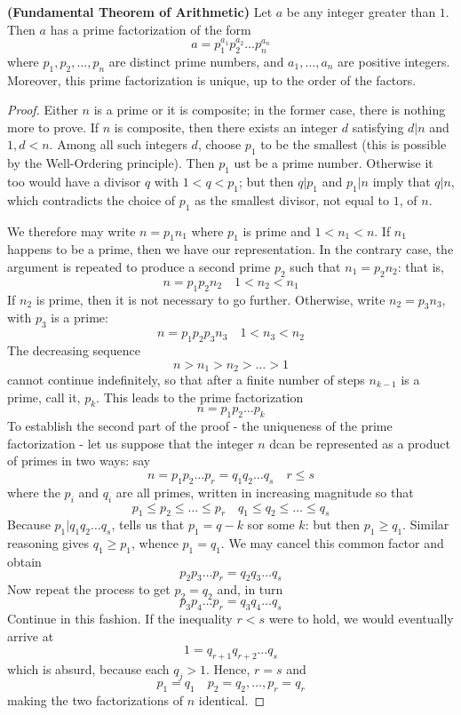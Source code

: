\begin{theorem}
    \textbf{(Fundamental Theorem of Arithmetic)} Let $a$ be any integer greater than $1$. Then $a$ has a prime factorization of the form
    \[
    a=p_1^{a_1}p_2^{a_2}\ldots p_n^{a_n}
    \]
    where $p_1,p_2,\ldots,p_n$ are distinct prime numbers, and $a_1,\ldots,a_n$ are positive integers. Moreover, this prime factorization is unique, up to the order of the factors.
\end{theorem}
\begin{proof}
    Either $n$ is a prime or it is composite; in the former case, there is nothing more to prove. If $n$ is composite, then there exists an integer $d$ satisfying $d|n$ and $1,d<n$. Among all such integers $d$, choose $p_1$ to be the smallest (this is possible by the Well-Ordering principle). Then $p_1$ ust be a prime number. Otherwise it too would have a divisor $q$ with $1<q<p_1$; but then $q|p_1$ and $p_1|n$ imply that $q|n$, which contradicts the choice of $p_1$ as the smallest divisor, not equal to $1$, of $n$.

    We therefore may write $n=p_1n_1$ where $p_1$ is prime and $1<n_1<n$. If $n_1$ happens to be a prime, then we have our representation. In the contrary case, the argument is repeated to produce a second prime $p_2$ such that $n_1 = p_2n_2$: that is,
    \[
    n=p_1p_2n_2\quad 1<n_2<n_1
    \]
    If $n_2$ is prime, then it is not necessary to go further. Otherwise, write $n_2 = p_3n_3$, with $p_3$ is a prime:
    \[
    n=p_1p_2p_3n_3\quad 1<n_3<n_2
    \]
    The decreasing sequence
    \[
    n>n_1>n_2>\ldots >1
    \]
    cannot continue indefinitely, so that after a finite number of steps $n_{k-1}$ is a prime, call it, $p_k$. This leads to the prime factorization
    \[
    n=p_1p_2\ldots p_k
    \]
    To establish the second part of the proof - the uniqueness of the prime factorization - let us suppose that the integer $n$ dcan be represented as a product of primes in two ways: say
    \[
    n=p_1p_2 \ldots p_r = q_1q_2 \ldots q_s\quad r\leq s
    \]
    where the $p_i$ and $q_i$ are all primes, written in increasing magnitude so that
    \[
    p_1 \leq p_2 \leq \ldots \leq p_r\quad  q_1 \leq q_2 \leq \ldots \leq q_s
    \]
    Because $p_1 |q_1q_2 \ldots q_s$, tells us that $p_1=q-k$ sor some $k$: but then $p_1\geq q_1$. Similar reasoning gives $q_1 \geq p_1$, whence $p_1=q_1$. We may cancel this common factor and obtain
    \[
    p_2p_3 \ldots p_r = q_2q_3 \ldots q_s
    \]
    Now repeat the process to get $p_2=q_2$ and, in turn
    \[
    p_3p_4\ldots p_r=q_3q_4\ldots q_s
    \]
    Continue in this fashion. If the inequality $r<s$ were to hold, we would eventually arrive at
    \[
    1=q_{r+1}q_{r+2} \ldots q_s
    \]
    which is absurd, because each $q_j >1$. Hence, $r=s$ and
    \[
    p_1=q_1 \quad p_2 =q_2, \ldots, p_r=q_r
    \]
    making the two factorizations of $n$ identical.
\end{proof}


